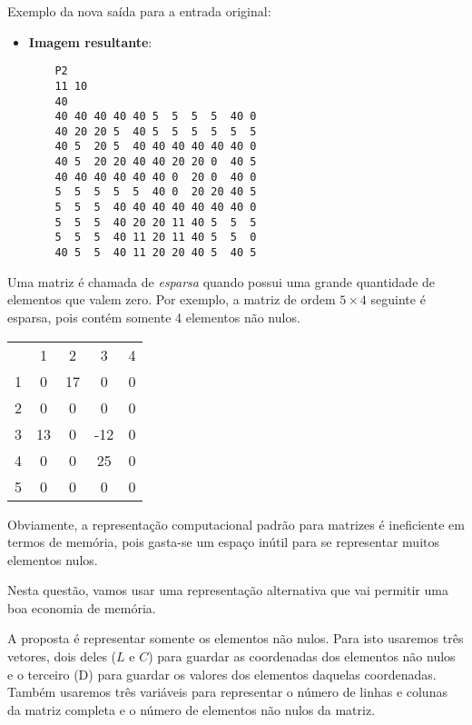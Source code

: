 Exemplo da nova saída para a entrada original:
\begin{itemize}
\vspace*{-2mm}      
    \item \textbf{Imagem resultante}:
    \begin{verbatim}
    P2
    11 10
    40
    40 40 40 40 40 5  5  5  5  40 0
    40 20 20 5  40 5  5  5  5  5  5
    40 5  20 5  40 40 40 40 40 40 0
    40 5  20 20 40 40 20 20 0  40 5
    40 40 40 40 40 40 0  20 0  40 0
    5  5  5  5  5  40 0  20 20 40 5
    5  5  5  40 40 40 40 40 40 40 0
    5  5  5  40 20 20 11 40 5  5  5
    5  5  5  40 11 20 11 40 5  5  0
    40 5  5  40 11 20 20 40 5  40 5
    \end{verbatim}
\end{itemize}

\item Uma matriz é chamada de \textit{esparsa} quando 
possui uma grande quantidade de elementos que valem zero. Por exemplo,
a matriz de ordem $5 \times 4$ seguinte é esparsa, pois contém somente
4 elementos não nulos.

\begin{center}
\begin{tabular}{c|c|c|c|c|} 
\multicolumn{1}{c}{} & \multicolumn{1}{c}{1} & \multicolumn{1}{c}{2} & \multicolumn{1}{c}{
3} & \multicolumn{1}{c}{4} \\ \cline{2-5}
1 & 0  & 17 & 0   & 0 \\ \cline{2-5}
2 & 0  & 0  & 0   & 0 \\ \cline{2-5}
3 & 13 & 0  & -12 & 0 \\ \cline{2-5}
4 & 0  & 0  & 25  & 0 \\ \cline{2-5}
5 & 0  & 0  & 0   & 0 \\ \cline{2-5}
\end{tabular}
\end{center}

Obviamente, a representação computacional padrão para matrizes é
ineficiente em termos de memória, pois gasta-se um espaço inútil para
se representar muitos elementos nulos. 

Nesta questão, vamos usar uma representação alternativa que vai permitir
uma boa economia de memória. 

A proposta é representar somente os elementos não nulos. Para isto usaremos
três vetores, dois deles ($L$ e $C$) 
para guardar as coordenadas dos elementos não nulos
e o terceiro (D) para guardar os valores dos elementos daquelas coordenadas. 
Também
usaremos três variáveis para representar o número de linhas e colunas
da matriz completa e o número de elementos não nulos da matriz.

